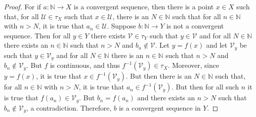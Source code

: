     \begin{proof}
        For if $a:\mathbb{N}\rightarrow{X}$ is a convergent sequence, then there
        is a point $x\in{X}$ such that, for all $\mathcal{U}\in\tau_{X}$ such
        that $x\in\mathcal{U}$, there is an $N\in\mathbb{N}$ such that for all
        $n\in\mathbb{N}$ with $n>N$, it is true that $a_{n}\in\mathcal{U}$.
        Suppose $b:\mathbb{N}\rightarrow{Y}$ is not a convergent sequence. Then
        for all $y\in{Y}$ there exists $\mathcal{V}\in\tau_{Y}$ such that
        $y\in\mathcal{V}$ and for all $N\in\mathbb{N}$ there exists an
        $n\in\mathbb{N}$ such that $n>N$ and $b_{n}\notin\mathcal{V}$. Let
        $y=f(x)$ and let $\mathcal{V}_{y}$ be such that $y\in\mathcal{V}_{y}$
        and for all $N\in\mathbb{N}$ there is an $n\in\mathbb{N}$ such that
        $n>N$ and $b_{n}\notin\mathcal{V}_{y}$. But $f$ is continuous, and thus
        $f^{\minus{1}}(\mathcal{V}_{y})\in\tau_{X}$. Moreover, since $y=f(x)$,
        it is true that $x\in{f}^{\minus{1}}(\mathcal{V}_{y})$. But then there
        is an $N\in\mathbb{N}$ such that, for all $n\in\mathbb{N}$ with $n>N$,
        it is true that $a_{n}\in{f}^{\minus{1}}(\mathcal{V}_{y})$. But then
        for all such $n$ it is true that $f(a_{n})\in\mathcal{V}_{y}$. But
        $b_{n}=f(a_{n})$ and there exists an $n>N$ such that
        $b_{n}\notin\mathcal{V}_{y}$, a contradiction. Therefore, $b$ is a
        convergent sequence in $Y$.
    \end{proof}
